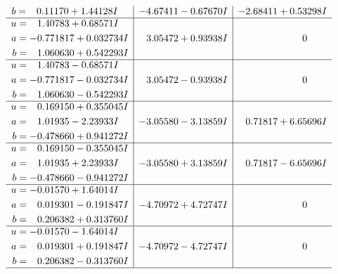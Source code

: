 \documentclass[1p]{elsarticle_modified}
\theoremstyle{definition}
\begin{document}
$$\begin{array}{c|c|c}
\begin{aligned}
b &= \phantom{-}0.11170 + 1.44128 I\end{aligned}
 & -4.67411 - 0.67670 I & -2.68411 + 0.53298 I \\ \hline\begin{aligned}
u &= \phantom{-}1.40783 + 0.68571 I \\
a &= -0.771817 + 0.032734 I \\
b &= \phantom{-}1.060630 + 0.542293 I\end{aligned}
 & \phantom{-}3.05472 + 0.93938 I & \phantom{-0.000000 } 0 \\ \hline\begin{aligned}
u &= \phantom{-}1.40783 - 0.68571 I \\
a &= -0.771817 - 0.032734 I \\
b &= \phantom{-}1.060630 - 0.542293 I\end{aligned}
 & \phantom{-}3.05472 - 0.93938 I & \phantom{-0.000000 } 0 \\ \hline\begin{aligned}
u &= \phantom{-}0.169150 + 0.355045 I \\
a &= \phantom{-}1.01935 - 2.23933 I \\
b &= -0.478660 + 0.941272 I\end{aligned}
 & -3.05580 - 3.13859 I & \phantom{-}0.71817 + 6.65696 I \\ \hline\begin{aligned}
u &= \phantom{-}0.169150 - 0.355045 I \\
a &= \phantom{-}1.01935 + 2.23933 I \\
b &= -0.478660 - 0.941272 I\end{aligned}
 & -3.05580 + 3.13859 I & \phantom{-}0.71817 - 6.65696 I \\ \hline\begin{aligned}
u &= -0.01570 + 1.64014 I \\
a &= \phantom{-}0.019301 - 0.191847 I \\
b &= \phantom{-}0.206382 + 0.313760 I\end{aligned}
 & -4.70972 + 4.72747 I & \phantom{-0.000000 } 0 \\ \hline\begin{aligned}
u &= -0.01570 - 1.64014 I \\
a &= \phantom{-}0.019301 + 0.191847 I \\
b &= \phantom{-}0.206382 - 0.313760 I\end{aligned}
 & -4.70972 - 4.72747 I & \phantom{-0.000000 } 0\\
 \hline 
 \end{array}$$\newpage\newpage\renewcommand{\arraystretch}{1}
\end{document}
